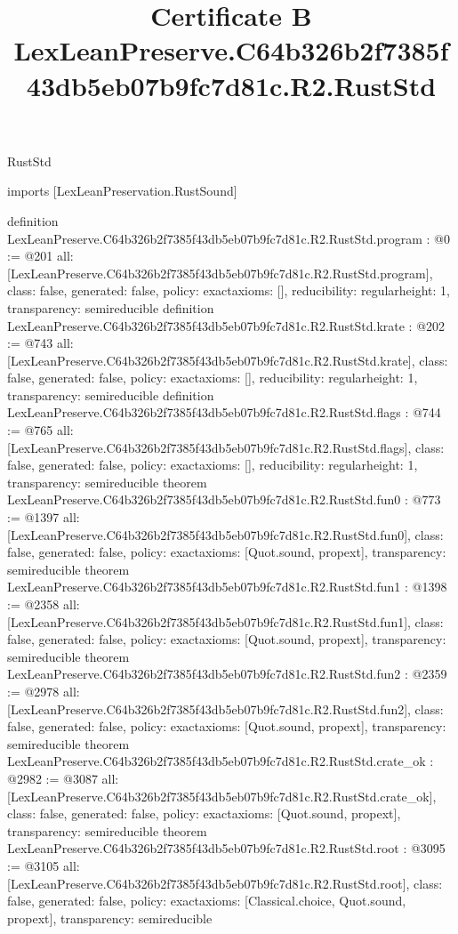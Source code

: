 \begin{lexlean}{RustStd}
\title{Certificate B LexLeanPreserve.C64b326b2f7385f43db5eb07b9fc7d81c.R2.RustStd}
\begin{coremodule}
imports [LexLeanPreservation.RustSound]

definition LexLeanPreserve.C64b326b2f7385f43db5eb07b9fc7d81c.R2.RustStd.program : @0 := @201 {
  all: [LexLeanPreserve.C64b326b2f7385f43db5eb07b9fc7d81c.R2.RustStd.program],
  class: false,
  generated: false,
  policy: exact{axioms: []},
  reducibility: regular{height: 1},
  transparency: semireducible
}
definition LexLeanPreserve.C64b326b2f7385f43db5eb07b9fc7d81c.R2.RustStd.krate : @202 := @743 {
  all: [LexLeanPreserve.C64b326b2f7385f43db5eb07b9fc7d81c.R2.RustStd.krate],
  class: false,
  generated: false,
  policy: exact{axioms: []},
  reducibility: regular{height: 1},
  transparency: semireducible
}
definition LexLeanPreserve.C64b326b2f7385f43db5eb07b9fc7d81c.R2.RustStd.flags : @744 := @765 {
  all: [LexLeanPreserve.C64b326b2f7385f43db5eb07b9fc7d81c.R2.RustStd.flags],
  class: false,
  generated: false,
  policy: exact{axioms: []},
  reducibility: regular{height: 1},
  transparency: semireducible
}
theorem LexLeanPreserve.C64b326b2f7385f43db5eb07b9fc7d81c.R2.RustStd.fun0 : @773 := @1397 {
  all: [LexLeanPreserve.C64b326b2f7385f43db5eb07b9fc7d81c.R2.RustStd.fun0],
  class: false,
  generated: false,
  policy: exact{axioms: [Quot.sound, propext]},
  transparency: semireducible
}
theorem LexLeanPreserve.C64b326b2f7385f43db5eb07b9fc7d81c.R2.RustStd.fun1 : @1398 := @2358 {
  all: [LexLeanPreserve.C64b326b2f7385f43db5eb07b9fc7d81c.R2.RustStd.fun1],
  class: false,
  generated: false,
  policy: exact{axioms: [Quot.sound, propext]},
  transparency: semireducible
}
theorem LexLeanPreserve.C64b326b2f7385f43db5eb07b9fc7d81c.R2.RustStd.fun2 : @2359 := @2978 {
  all: [LexLeanPreserve.C64b326b2f7385f43db5eb07b9fc7d81c.R2.RustStd.fun2],
  class: false,
  generated: false,
  policy: exact{axioms: [Quot.sound, propext]},
  transparency: semireducible
}
theorem LexLeanPreserve.C64b326b2f7385f43db5eb07b9fc7d81c.R2.RustStd.crate_ok : @2982 := @3087 {
  all: [LexLeanPreserve.C64b326b2f7385f43db5eb07b9fc7d81c.R2.RustStd.crate_ok],
  class: false,
  generated: false,
  policy: exact{axioms: [Quot.sound, propext]},
  transparency: semireducible
}
theorem LexLeanPreserve.C64b326b2f7385f43db5eb07b9fc7d81c.R2.RustStd.root : @3095 := @3105 {
  all: [LexLeanPreserve.C64b326b2f7385f43db5eb07b9fc7d81c.R2.RustStd.root],
  class: false,
  generated: false,
  policy: exact{axioms: [Classical.choice, Quot.sound, propext]},
  transparency: semireducible
}


\end{coremodule}
\end{lexlean}
